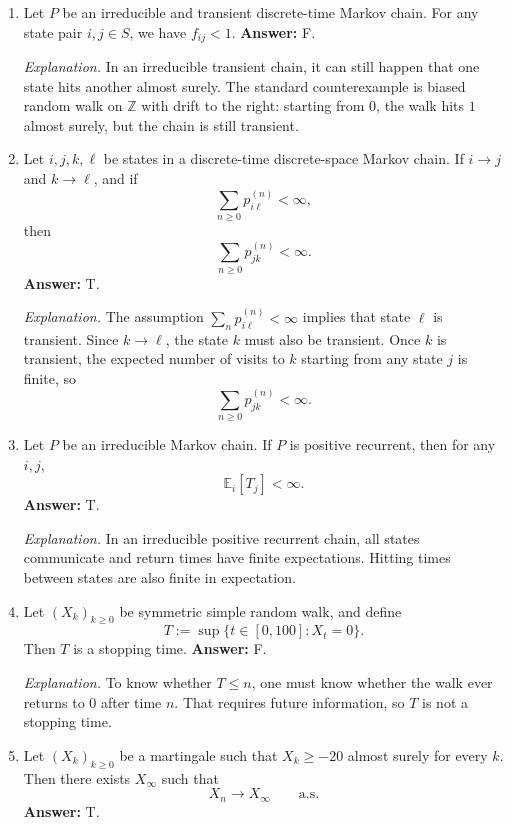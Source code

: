 \documentclass[11pt]{article}
\theoremstyle{definition}
\begin{document}
\begin{enumerate}[label=(\arabic*)]
    \item Let $P$ be an irreducible and transient discrete-time Markov chain. For any state pair $i,j\in S$, we have $f_{ij}<1$.
    \textbf{Answer:} F.

    \emph{Explanation.} In an irreducible transient chain, it can still happen that one state hits another almost surely. The standard counterexample is biased random walk on $\mathbb Z$ with drift to the right: starting from $0$, the walk hits $1$ almost surely, but the chain is still transient.

    \item Let $i,j,k,\ell$ be states in a discrete-time discrete-space Markov chain. If $i\to j$ and $k\to \ell$, and if
    \[
    \sum_{n\ge 0} p_{i\ell}^{(n)}<\infty,
    \]
    then
    \[
    \sum_{n\ge 0} p_{jk}^{(n)}<\infty.
    \]
    \textbf{Answer:} T.

    \emph{Explanation.} The assumption $\sum_n p_{i\ell}^{(n)}<\infty$ implies that state $\ell$ is transient. Since $k\to \ell$, the state $k$ must also be transient. Once $k$ is transient, the expected number of visits to $k$ starting from any state $j$ is finite, so
    \[
    \sum_{n\ge 0} p_{jk}^{(n)}<\infty.
    \]

    \item Let $P$ be an irreducible Markov chain. If $P$ is positive recurrent, then for any $i,j$,
    \[
    \mathbb E_i[T_j] < \infty.
    \]
    \textbf{Answer:} T.

    \emph{Explanation.} In an irreducible positive recurrent chain, all states communicate and return times have finite expectations. Hitting times between states are also finite in expectation.

    \item Let $(X_k)_{k\ge 0}$ be symmetric simple random walk, and define
    \[
    T:=\sup\{t\in[0,100]: X_t=0\}.
    \]
    Then $T$ is a stopping time.
    \textbf{Answer:} F.

    \emph{Explanation.} To know whether $T\le n$, one must know whether the walk ever returns to $0$ after time $n$. That requires future information, so $T$ is not a stopping time.

    \item Let $(X_k)_{k\ge 0}$ be a martingale such that $X_k\ge -20$ almost surely for every $k$. Then there exists $X_\infty$ such that
    \[
    X_n\to X_\infty \qquad \text{a.s.}
    \]
    \textbf{Answer:} T.


\end{enumerate}
\end{document}
